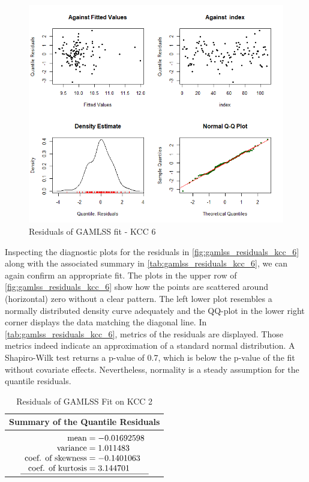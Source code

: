 \begin{figure}[H]
\centering
  \includegraphics[width=0.95\linewidth]{figures/gamlss_residuals_kcc_6.png}
  \caption{Residuals of GAMLSS fit - KCC 6}
  \label{fig:gamlss_residuals_kcc_6}
\end{figure}


Inspecting the diagnostic plots for the residuals in \autoref{fig:gamlss_residuals_kcc_6} along with the associated summary in \autoref{tab:gamlss_residuals_kcc_6}, we can again confirm an appropriate fit. The plots in the upper row of \autoref{fig:gamlss_residuals_kcc_6} show how the points are scattered around (horizontal) zero without a clear pattern. The left lower plot resembles a normally distributed density curve adequately and the QQ-plot in the lower right corner displays the data matching the diagonal line. In \autoref{tab:gamlss_residuals_kcc_6}, metrics of the residuals are displayed. Those metrics indeed indicate an approximation of a standard normal distribution.  A Shapiro-Wilk test returns a p-value of 0.7, which is below the p-value of the fit without covariate effects. Nevertheless, normality is a steady assumption for the quantile residuals.
\\






\begin{table}[H]
\centering
\begin{tabular}{c}
\hline
\rowcolor{white} 
\textbf{Summary of the Quantile Residuals} \\ \hline\hline
 $\begin{array}[t]{ r @{{}={}} l }
\text{mean} & -0.01692598                         \\ 
\text{variance} & 1.011483                         \\ 
\text{coef. of skewness} & -0.1401063               \\ 
\text{coef. of kurtosis} & 3.144701                \\ \hline
\end{array}$
\end{tabular}
\caption{Residuals of GAMLSS Fit on KCC 2}
\label{tab:gamlss_residuals_kcc_6}
\end{table}


